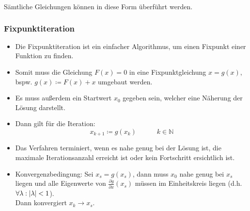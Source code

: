 				Sämtliche Gleichungen können in diese Form überführt werden.

			\subsubsection{Fixpunktiteration} %
				\begin{itemize}
					\item Die Fixpunktiteration ist ein einfacher Algorithmus, um einen Fixpunkt einer Funktion zu finden.
					\item Somit muss die Gleichung \( F(x) = 0 \) in eine Fixpunktgleichung \( x = g(x) \), bspw. \( g(x) \coloneqq F(x) + x \) umgebaut werden.
					\item Es muss außerdem ein Startwert \( x _ 0 \) gegeben sein, welcher eine Näherung der Lösung darstellt.
					\item Dann gilt für die Iteration:
						\begin{equation*}
							x_ { k + 1 } \coloneqq g(x _ k) \quad\quad\quad k \in \mathbb{N}
						\end{equation*}
					\item Das Verfahren terminiert, wenn es nahe genug bei der Lösung ist, die maximale Iterationsanzahl erreicht ist oder kein Fortschritt ersichtlich ist.
					\item Konvergenzbedingung: Sei \( x _ s = g(x _ s) \), dann muss \( x _ 0 \) nahe genug bei \( x _ s \) liegen und alle Eigenwerte von \( \frac{\partial g}{\partial x} (x _ s) \) müssen im Einheitskreis liegen (d.h. \( \forall \lambda : \abs{\lambda} < 1 \)). \\ Dann konvergiert \( x _ k \rightarrow x _ s \).
				\end{itemize}

